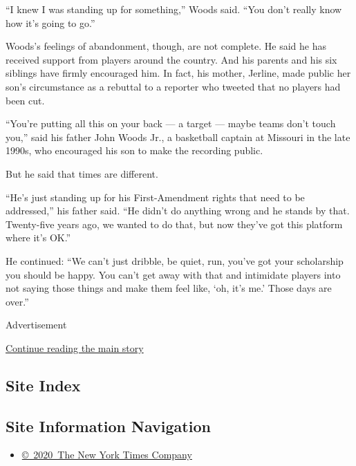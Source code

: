 ``I knew I was standing up for something,'' Woods said. ``You don't
really know how it's going to go.''

Woods's feelings of abandonment, though, are not complete. He said he
has received support from players around the country. And his parents
and his six siblings have firmly encouraged him. In fact, his mother,
Jerline, made public her son's circumstance as a rebuttal to a reporter
who tweeted that no players had been cut.

``You're putting all this on your back --- a target --- maybe teams
don't touch you,'' said his father John Woods Jr., a basketball captain
at Missouri in the late 1990s, who encouraged his son to make the
recording public.

But he said that times are different.

``He's just standing up for his First-Amendment rights that need to be
addressed,'' his father said. ``He didn't do anything wrong and he
stands by that. Twenty-five years ago, we wanted to do that, but now
they've got this platform where it's OK.''

He continued: ``We can't just dribble, be quiet, run, you've got your
scholarship you should be happy. You can't get away with that and
intimidate players into not saying those things and make them feel like,
`oh, it's me.' Those days are over.''

Advertisement

\protect\hyperlink{after-bottom}{Continue reading the main story}

\hypertarget{site-index}{%
\subsection{Site Index}\label{site-index}}

\hypertarget{site-information-navigation}{%
\subsection{Site Information
Navigation}\label{site-information-navigation}}

\begin{itemize}
\tightlist
\item
  \href{https://help.nytimes.com/hc/en-us/articles/115014792127-Copyright-notice}{©~2020~The
  New York Times Company}
\end{itemize}

